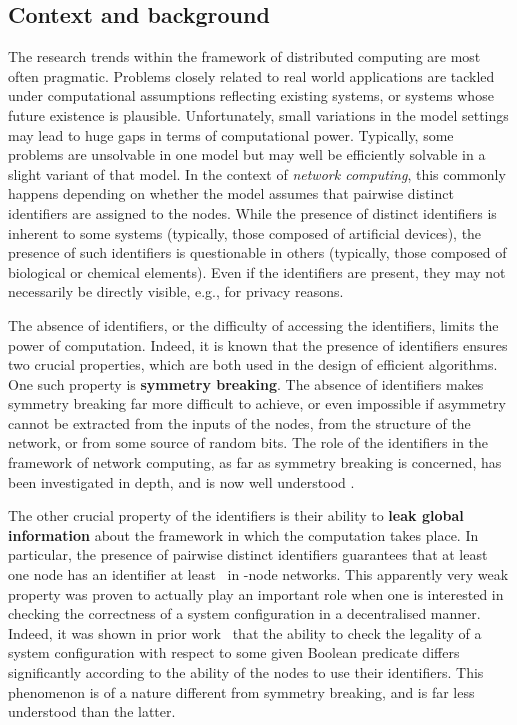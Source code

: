 \documentclass[11pt,a4paper]{article}
\theoremstyle{definition}
\theoremstyle{remark}
\begin{document}
\subsection{Context and background}

The  research trends within the framework of distributed computing are most often pragmatic. Problems closely related to real world applications are tackled under computational assumptions reflecting existing systems, or systems whose future existence is plausible. Unfortunately, small variations in the model settings may lead to huge gaps in terms of computational power. Typically, some problems are unsolvable in one model but may well be efficiently solvable in a slight variant of that model. In the context of \emph{network computing}, this commonly happens depending on whether the model assumes that pairwise distinct identifiers are assigned to the nodes. While the presence of distinct identifiers is inherent to some systems (typically, those composed of artificial devices), the presence of such identifiers is questionable in others (typically, those composed of biological or chemical elements). Even if the identifiers are present, they may not necessarily be directly visible, e.g., for privacy reasons.

The absence of identifiers, or the difficulty of accessing the identifiers, limits the power of computation. Indeed, it is known that the presence of identifiers ensures two crucial properties, which are both used in the design of efficient algorithms. One such property is \textbf{symmetry breaking}. The absence of identifiers makes symmetry breaking far more difficult to achieve, or even impossible if asymmetry cannot be extracted from the inputs of the nodes, from the structure of the network, or from some source of random bits. The role of the identifiers in the framework of network computing, as far as symmetry breaking is concerned, has been investigated in depth, and is now well understood \cite{angluin80local,boldi01effective,chalopin06groupings,czygrinow08fast,diks95anonymous,emek14anonymous,emek14revocable,fraigniaud01labels,goos13local-approximation,hasemann14scheduling,hella15weak-models,lenzen08leveraging,linial92locality,mayer95local,naor95what,norris94classifying-anonymous,yamashita96computing,yamashita99leader,fich03hundreds,kranakis96symmetry,suomela13survey}.

The other crucial property of the identifiers is their ability to \textbf{leak global information} about the framework in which the computation takes place. In particular, the presence of pairwise distinct identifiers guarantees that at least one node has an identifier at least~ in -node networks. This apparently very weak property was proven to actually play an important role when one is interested in checking the correctness of a system configuration  in a decentralised manner. Indeed, it was shown in prior work~\cite{fraigniaud13ld-id} that the ability to check the legality of a system configuration with respect to some given Boolean predicate differs significantly according to the ability of the nodes to use their identifiers. This phenomenon is of a nature different from symmetry breaking, and is far less understood than the latter. 
\end{document}

